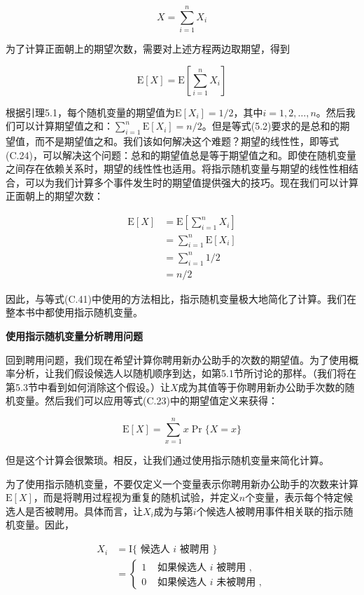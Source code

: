 \documentclass[lang=cn,newtx,10pt,scheme=chinese]{elegantbook}
\begin{document}
$$
X=\sum_{i=1}^n X_i
$$

为了计算正面朝上的期望次数，需要对上述方程两边取期望，得到

$$
\mathrm{E}[X]=\mathrm{E}[\sum_{i=1}^n X_i]
$$

根据引理5.1，每个随机变量的期望值为$\mathrm{E}[X_i]=1 / 2$，其中$i=1,2, \ldots, n$。然后我们可以计算期望值之和：$\sum_{i=1}^n \mathrm{E}[X_i]=n / 2$。但是等式(5.2)要求的是总和的期望值，而不是期望值之和。我们该如何解决这个难题？期望的线性性，即等式(C.24)，可以解决这个问题：总和的期望值总是等于期望值之和。即使在随机变量之间存在依赖关系时，期望的线性性也适用。将指示随机变量与期望的线性性相结合，可以为我们计算多个事件发生时的期望值提供强大的技巧。现在我们可以计算正面朝上的期望次数：

$$
\begin{aligned}
\mathrm{E}[X] & =\mathrm{E}[\sum_{i=1}^n X_i] \\
& =\sum_{i=1}^n \mathrm{E}[X_i] \\
& =\sum_{i=1}^n 1 / 2 \\
& =n / 2
\end{aligned}
$$

因此，与等式(C.41)中使用的方法相比，指示随机变量极大地简化了计算。我们在整本书中都使用指示随机变量。

\textbf{使用指示随机变量分析聘用问题}

回到聘用问题，我们现在希望计算你聘用新办公助手的次数的期望值。为了使用概率分析，让我们假设候选人以随机顺序到达，如第5.1节所讨论的那样。（我们将在第5.3节中看到如何消除这个假设。）让$X$成为其值等于你聘用新办公助手次数的随机变量。然后我们可以应用等式(C.23)中的期望值定义来获得：

$$
\mathrm{E}[X]=\sum_{x=1}^n x \operatorname{Pr}\{X=x\}
$$

但是这个计算会很繁琐。相反，让我们通过使用指示随机变量来简化计算。

为了使用指示随机变量，不要仅定义一个变量表示你聘用新办公助手的次数来计算$\mathrm{E}[X]$，而是将聘用过程视为重复的随机试验，并定义$n$个变量，表示每个特定候选人是否被聘用。具体而言，让$X_i$成为与第$i$个候选人被聘用事件相关联的指示随机变量。因此，

$$
\begin{aligned}
X_i & =\mathrm{I} \{\text { 候选人 } i \text { 被聘用 }\} \\
& = \begin{cases}1 & \text { 如果候选人 } i \text { 被聘用 }, \\
0 & \text { 如果候选人 } i \text { 未被聘用 },\end{cases}
\end{aligned}
$$
\end{document}
